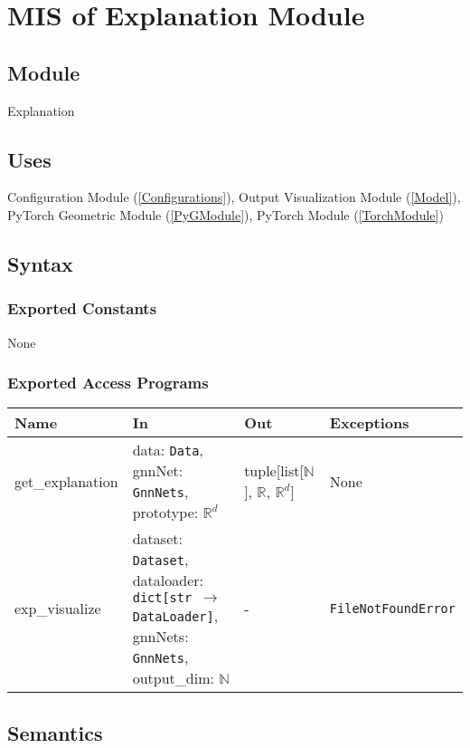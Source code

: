 \documentclass[12pt, titlepage]{article}
\begin{document}
\newpage




\section{MIS of Explanation Module} \label{Explanation}

\subsection{Module}
Explanation

\subsection{Uses}
Configuration Module (\ref{Configurations}), Output Visualization Module (\ref{Model}), PyTorch Geometric Module (\ref{PyGModule}), PyTorch Module (\ref{TorchModule})

\subsection{Syntax}

\subsubsection{Exported Constants}
None

\subsubsection{Exported Access Programs}

\begin{center}
\begin{tabular}{p{3cm} >{\raggedright\arraybackslash}p{5cm} p{5cm} p{2.5cm}}
\hline
\textbf{Name} & \textbf{In} & \textbf{Out} & \textbf{Exceptions} \\
\hline
get\_explanation & data: \texttt{Data}, gnnNet: \texttt{GnnNets}, prototype: \(\mathbb{R}^d\) & tuple[list[\(\mathbb{N}\)], \(\mathbb{R}\), \(\mathbb{R}^{d}\)] & None \\
exp\_visualize & dataset: \texttt{Dataset}, dataloader: \texttt{dict[str \(\rightarrow\) DataLoader]}, gnnNets: \texttt{GnnNets}, output\_dim: \(\mathbb{N}\) & - & \texttt{FileNotFoundError} \\
\hline
\end{tabular}
\end{center}

\subsection{Semantics}
\end{document}
